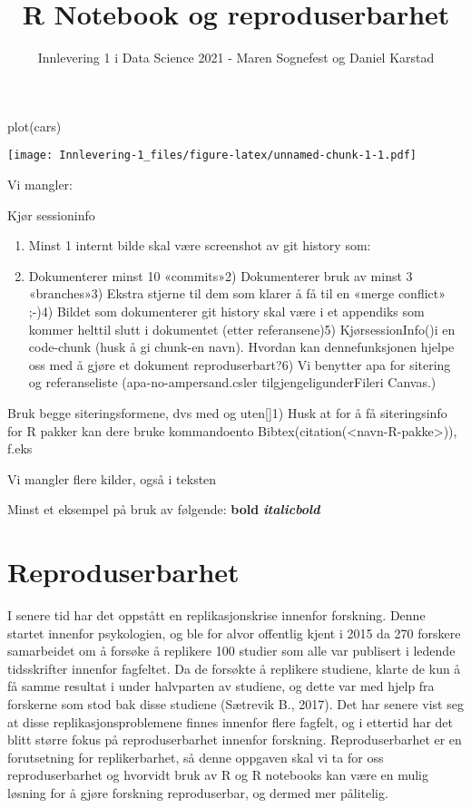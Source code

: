 \documentclass[
  12pt,
]{article}
\title{R Notebook og reproduserbarhet}
\author{Innlevering 1 i Data Science 2021 - Maren Sognefest og Daniel
Karstad}
\date{}
\newenvironment{Shaded}{\begin{snugshade}}{\end{snugshade}}
\newcommand{\FunctionTok}[1]{\textcolor[rgb]{0.00,0.00,0.00}{#1}}
\newcommand{\NormalTok}[1]{#1}
\begin{document}
\maketitle

\begin{Shaded}
\begin{Highlighting}[]
\FunctionTok{plot}\NormalTok{(cars)}
\end{Highlighting}
\end{Shaded}

\texttt{[image: Innlevering-1\_files/figure-latex/unnamed-chunk-1-1.pdf]}

Vi mangler:

Kjør sessioninfo

\begin{enumerate}
\def\labelenumi{\arabic{enumi})}
\setcounter{enumi}{3}
\item
  Minst 1 internt bilde skal være screenshot av git history som:
\item
  Dokumenterer minst 10 «commits»2) Dokumenterer bruk av minst 3
  «branches»3) Ekstra stjerne til dem som klarer å få til en «merge
  conflict» ;-)4) Bildet som dokumenterer git history skal være i et
  appendiks som kommer helttil slutt i dokumentet (etter referansene)5)
  KjørsessionInfo()i en code-chunk (husk å gi chunk-en navn). Hvordan
  kan dennefunksjonen hjelpe oss med å gjøre et dokument
  reproduserbart?6) Vi benytter apa for sitering og referanseliste
  (apa-no-ampersand.csler tilgjengeligunderFileri Canvas.)
\end{enumerate}

Bruk begge siteringsformene, dvs med og uten{[}{]}1) Husk at for å få
siteringsinfo for R pakker kan dere bruke kommandoento
Bibtex(citation(\textless navn-R-pakke\textgreater)), f.eks

Vi mangler flere kilder, også i teksten

Minst et eksempel på bruk av følgende: \textbf{bold}
\textbf{\emph{italicbold}}

\hypertarget{reproduserbarhet}{%
\section{Reproduserbarhet}\label{reproduserbarhet}}

I senere tid har det oppstått en replikasjonskrise innenfor forskning.
Denne startet innenfor psykologien, og ble for alvor offentlig kjent i
2015 da 270 forskere samarbeidet om å forsøke å replikere 100 studier
som alle var publisert i ledende tidsskrifter innenfor fagfeltet. Da de
forsøkte å replikere studiene, klarte de kun å få samme resultat i under
halvparten av studiene, og dette var med hjelp fra forskerne som stod
bak disse studiene (Sætrevik B., 2017). Det har senere vist seg at disse
replikasjonsproblemene finnes innenfor flere fagfelt, og i ettertid har
det blitt større fokus på reproduserbarhet innenfor forskning.
Reproduserbarhet er en forutsetning for replikerbarhet, så denne
oppgaven skal vi ta for oss reproduserbarhet og hvorvidt bruk av R og R
notebooks kan være en mulig løsning for å gjøre forskning reproduserbar,
og dermed mer pålitelig.
\end{document}
